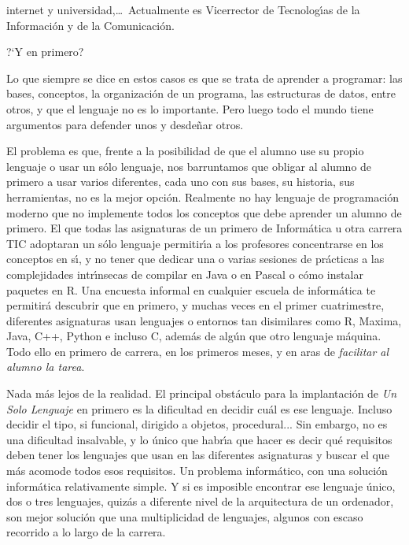 \documentclass[twoside,10pt]{article}
\begin{document}
\begin{multicols}{2}
{{\begin{window}
		internet y universidad,\ldots\ 
		Actualmente es Vicerrector de Tecnolog\'{\i}as de la Informaci\'{o}n y
de la Comunicaci\'{o}n.   
		\end{window}}}

 
?`Y en primero? 



Lo que siempre se dice en estos casos es que se trata de aprender a
programar: las bases, conceptos, la organizaci\'on de un programa, las
estructuras de datos, entre otros, y que el lenguaje no es lo importante.
Pero luego todo el mundo tiene argumentos para defender unos
y desde\~{n}ar otros.

El problema es que, frente a la posibilidad de que el alumno use su
propio lenguaje o usar un s\'olo lenguaje, nos barruntamos que obligar
al alumno de primero a usar varios diferentes, cada uno con
sus bases, su historia, sus herramientas, no es la mejor opci\'on. 
Realmente no hay lenguaje de programaci\'on moderno que no
implemente todos los conceptos que debe aprender un alumno de
primero. El que todas las asignaturas de un primero de Inform\'atica u
otra carrera TIC adoptaran un s\'olo lenguaje permitir\'{\i}a a los profesores
concentrarse en los conceptos en s\'{\i}, y no tener que dedicar una o
varias sesiones de pr\'acticas a las complejidades intr\'{\i}nsecas de
compilar en Java o en Pascal o c\'omo instalar paquetes en R. Una
encuesta informal en cualquier escuela de inform\'atica te permitir\'a
descubrir que en primero, y muchas veces en el primer cuatrimestre,
diferentes asignaturas usan lenguajes o entornos tan disimilares como
R, Maxima, Java, C++, Python e incluso C, adem\'as de alg\'un
que otro lenguaje m\'aquina. Todo ello en primero de carrera, en los
primeros meses, y en aras de {\em facilitar al alumno la tarea}. 

Nada m\'as lejos de la realidad. El principal obst\'aculo para la
implantaci\'on de {\em Un Solo Lenguaje} en primero es la dificultad
en decidir cu\'al es ese lenguaje. Incluso decidir el tipo, si
funcional, dirigido a objetos, procedural... Sin embargo, no es una
dificultad insalvable, y lo \'unico que habr\'{\i}a que hacer es decir qu\'e
requisitos deben tener los lenguajes que usan en las diferentes
asignaturas y buscar el que m\'as acomode todos esos requisitos. 
Un problema inform\'atico, con una soluci\'on inform\'atica relativamente
simple. Y si es imposible encontrar ese lenguaje \'unico, dos o tres
lenguajes, quiz\'as a diferente nivel de la arquitectura de un
ordenador, son mejor soluci\'on que una multiplicidad de lenguajes,
algunos con escaso recorrido a lo largo de la carrera.


\end{multicols}
\end{document}
